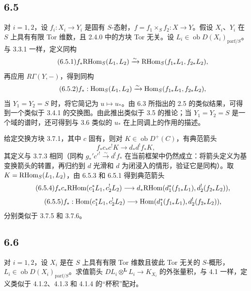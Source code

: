 \subsection*{6.5}
对 $i=1,2$，设 $f_i:X_i\to Y_i$ 是固有 $S$-态射，$f=f_1\times_Sf_2:X\to Y$。假设 $X_i$、$Y_i$ 在 $S$ 上具有有限 Tor 维数，且 2.4.0 中的方块 Tor 无关。设 $L_i\in\operatorname{ob}D(X_i)_{\mathrm{parf}/S}$。与 3.3.1 一样，定义同构
\begin{equation}
\tag{6.5.1}
f_*\mathrm{RHom}_S(L_1,L_2)\xrightarrow{\sim}\mathrm{RHom}_S(f_{1*}L_1,f_{2*}L_2),
\end{equation}
再应用 $R\Gamma(Y,-)$，得到同构
\begin{equation}
\tag{6.5.2}
f_*:\operatorname{Hom}_S(L_1,L_2)\xrightarrow{\sim}\operatorname{Hom}_S(f_{1*}L_1,f_{2*}L_2),
\end{equation}
当 $Y_1=Y_2=S$ 时，将它简记为 $u\mapsto u_*$。由 6.3 所指出的 2.5 的类似结果，可得到一个类似于 3.4.1 的交换图。由此推出类似于 3.5 的推论；当 $Y_1=Y_2=S$ 是一个域的谱时，还可得到与 3.6 类似的 $u_*$ 在上同调上的作用的描述。

给定交换方块 3.7.1，其中 $c$ 固有，则对 $K\in\operatorname{ob}D^+(C)$，有典范箭头
\begin{equation}
\tag{6.5.3}
f_*c_*c^!K\longrightarrow d_*d^!f_*K,
\end{equation}
其定义与 3.7.3 相同（同构 $g_*'c'^!\xrightarrow{\sim}d^!f_*$ 在当前框架中仍然成立：将箭头定义为基变换箭头的转置，再归约到 $d$ 光滑和 $d$ 为闭浸入的情形，验证它是同构）。取 $K=\mathrm{RHom}_S(L_1,L_2)$，由 6.5.3 和 6.5.1 得到典范箭头
\begin{equation}
\tag{6.5.4}
f_*c_*\mathrm{RHom}(c_1^*L_1,c_2^!L_2)\longrightarrow d_*\mathrm{RHom}(d_1^*(f_{1*}L_1),d_2^!(f_{2*}L_2)),
\end{equation}
\begin{equation}
\tag{6.5.5}
f_*:\operatorname{Hom}(c_1^*L_1,c_2^!L_2)\longrightarrow\operatorname{Hom}(d_1^*(f_{1*}L_1),d_2^!(f_{2*}L_2)),
\end{equation}
分别类似于 3.7.5 和 3.7.6。

\subsection*{6.6}
对 $i=1,2$，设 $X_i$ 是在 $S$ 上具有有限 Tor 维数且彼此 Tor 无关的 $S$-概形，$L_i\in\operatorname{ob}D(X_i)_{\mathrm{parf}/S}$。求值箭头 $DL_i\otimes^{\mathbf L}L_i\to K_{X_i}$ 的外张量积，与 4.1 一样，定义类似于 4.1.2、4.1.3 和 4.1.4 的“杯积”配对。

